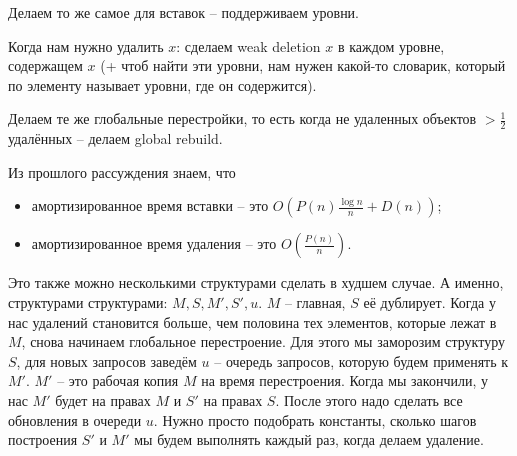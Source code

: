 Делаем то же самое для вставок -- поддерживаем уровни.

Когда нам нужно удалить $x$: сделаем weak deletion $x$ в каждом уровне, содержащем $x$ (+ чтоб найти эти уровни, нам нужен какой-то словарик, который по элементу называет уровни, где он содержится).

Делаем те же глобальные перестройки, то есть когда не удаленных объектов $>\frac{1}{2}$ удалённых -- делаем global rebuild.

Из прошлого рассуждения знаем, что
\begin{itemize}
    \item амортизированное время вставки -- это $O\left(P(n)\frac{\log n}{n}+D(n)\right)$;
    \item амортизированное время удаления -- это $O\left(\frac{P(n)}{n}\right)$.
\end{itemize}

Это также можно несколькими структурами сделать в худшем случае. А именно, структурами структурами: $M,S,M',S',u$. $M$ -- главная, $S$ её дублирует. Когда у нас удалений становится больше, чем половина тех элементов, которые лежат в $M$, снова начинаем глобальное перестроение. Для этого мы заморозим структуру $S$, для новых запросов заведём $ u$ -- очередь запросов, которую будем применять к $M'$. $M'$ -- это рабочая копия $M$ на время перестроения. Когда мы закончили, у нас $M'$ будет на правах $M$ и $S'$ на правах $S$. После этого надо сделать все обновления в очереди $u$. Нужно просто подобрать константы, сколько шагов построения $S'$ и $M'$ мы будем выполнять каждый раз, когда делаем удаление.